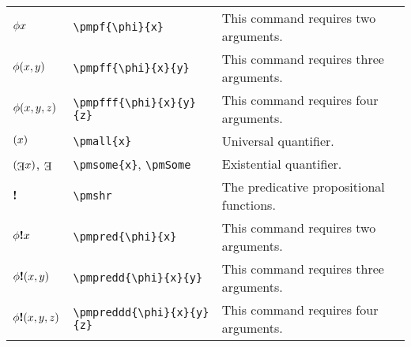 \documentclass[12pt]{article}
\begin{document}
\begin{tabular}{@{}p{3cm} | p{5cm} | p{8.25cm}}
	$\phi x$ & \verb|\pmpf{\phi}{x}| & This command requires two arguments. \\
	$\phi(x, y)$ & \verb|\pmpff{\phi}{x}{y}| & This command requires three arguments. \\
	$\phi(x, y, z)$ & \verb|\pmpfff{\phi}{x}{y}{z}| & This command requires four arguments. \\
	$(x)$ &\verb|\pmall{x}| & Universal quantifier. \\
	$\pmsome{x}$, $\pmSome$ & \verb|\pmsome{x}|, \verb|\pmSome| & Existential quantifier. \\
	$\textbf{!}$ & \verb|\pmshr| & The predicative propositional functions. \\
	$\phi\textbf{!} x$ & \verb|\pmpred{\phi}{x}| & This command requires two arguments. \\
	$\phi\textbf{!}(x, y)$ & \verb|\pmpredd{\phi}{x}{y}| & This command requires three arguments. \\
	$\phi\textbf{!}(x, y, z)$ & \verb|\pmpreddd{\phi}{x}{y}{z}| & This command requires four arguments.
\end{tabular}
\end{document}
